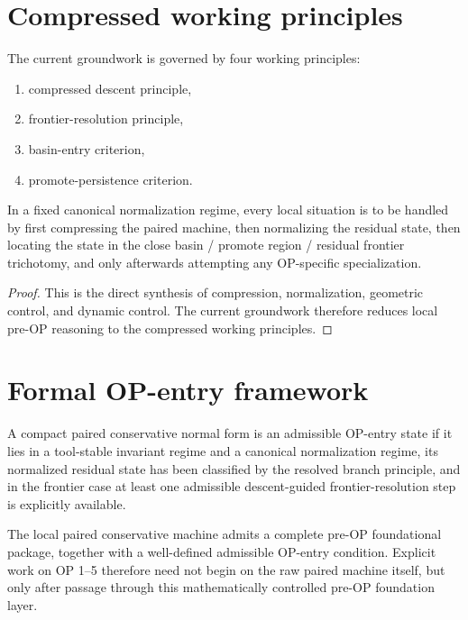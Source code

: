 \section{Compressed working principles}
\begin{definition}\label{def:compressed-working-principles}
The current groundwork is governed by four working principles:
\begin{enumerate}[leftmargin=2em]
 \item compressed descent principle,
 \item frontier-resolution principle,
 \item basin-entry criterion,
 \item promote-persistence criterion.
\end{enumerate}
\end{definition}

\begin{theorem}\label{thm:compressed-working-principle-theorem}
In a fixed canonical normalization regime, every local situation is to be handled by first compressing the paired machine, then normalizing the residual state, then locating the state in the close basin / promote region / residual frontier trichotomy, and only afterwards attempting any OP-specific specialization.
\end{theorem}

\begin{proof}
This is the direct synthesis of compression, normalization, geometric control, and dynamic control. The current groundwork therefore reduces local pre-OP reasoning to the compressed working principles.
\end{proof}

\section{Formal OP-entry framework}
\begin{definition}\label{def:admissible-op-entry-state}
A compact paired conservative normal form is an admissible OP-entry state if it lies in a tool-stable invariant regime and a canonical normalization regime, its normalized residual state has been classified by the resolved branch principle, and in the frontier case at least one admissible descent-guided frontier-resolution step is explicitly available.
\end{definition}

\begin{theorem}\label{thm:pre-op-foundation-synthesis}
The local paired conservative machine admits a complete pre-OP foundational package, together with a well-defined admissible OP-entry condition. Explicit work on OP 1--5 therefore need not begin on the raw paired machine itself, but only after passage through this mathematically controlled pre-OP foundation layer.
\end{theorem}

